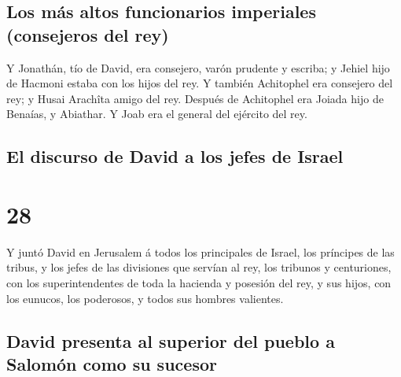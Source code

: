 \hypertarget{los-muxe1s-altos-funcionarios-imperiales-consejeros-del-rey}{%
\subsection{Los más altos funcionarios imperiales (consejeros del
rey)}\label{los-muxe1s-altos-funcionarios-imperiales-consejeros-del-rey}}

 Y Jonathán, tío de David, era consejero, varón prudente
y escriba; y Jehiel hijo de Hacmoni estaba con los hijos del rey.
 Y también Achitophel era consejero del rey; y Husai
Arachîta amigo del rey.  Después de Achitophel era Joiada
hijo de Benaías, y Abiathar. Y Joab era el general del ejército del rey.

\hypertarget{el-discurso-de-david-a-los-jefes-de-israel}{%
\subsection{El discurso de David a los jefes de
Israel}\label{el-discurso-de-david-a-los-jefes-de-israel}}

\hypertarget{section-27}{%
\section{28}\label{section-27}}

 Y juntó David en Jerusalem á todos los principales de
Israel, los príncipes de las tribus, y los jefes de las divisiones que
servían al rey, los tribunos y centuriones, con los superintendentes de
toda la hacienda y posesión del rey, y sus hijos, con los eunucos, los
poderosos, y todos sus hombres valientes.

\hypertarget{david-presenta-al-superior-del-pueblo-a-salomuxf3n-como-su-sucesor}{%
\subsection{David presenta al superior del pueblo a Salomón como su
sucesor}\label{david-presenta-al-superior-del-pueblo-a-salomuxf3n-como-su-sucesor}}

